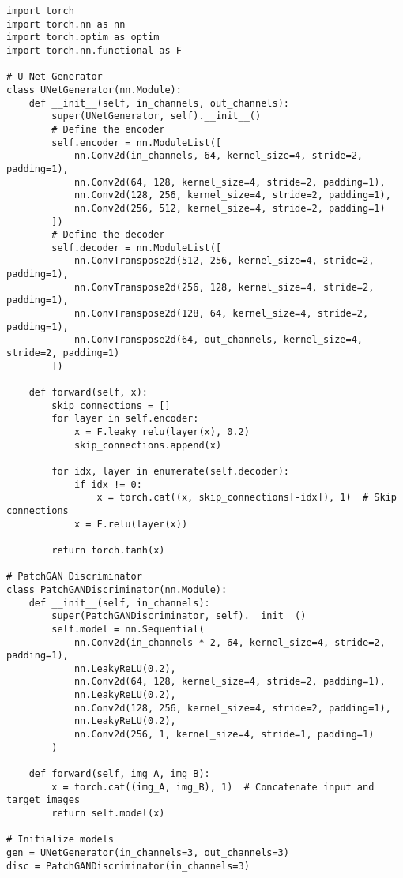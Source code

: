 \begin{lstlisting}[style=python]
import torch
import torch.nn as nn
import torch.optim as optim
import torch.nn.functional as F

# U-Net Generator
class UNetGenerator(nn.Module):
    def __init__(self, in_channels, out_channels):
        super(UNetGenerator, self).__init__()
        # Define the encoder
        self.encoder = nn.ModuleList([
            nn.Conv2d(in_channels, 64, kernel_size=4, stride=2, padding=1), 
            nn.Conv2d(64, 128, kernel_size=4, stride=2, padding=1), 
            nn.Conv2d(128, 256, kernel_size=4, stride=2, padding=1), 
            nn.Conv2d(256, 512, kernel_size=4, stride=2, padding=1)
        ])
        # Define the decoder
        self.decoder = nn.ModuleList([
            nn.ConvTranspose2d(512, 256, kernel_size=4, stride=2, padding=1),
            nn.ConvTranspose2d(256, 128, kernel_size=4, stride=2, padding=1),
            nn.ConvTranspose2d(128, 64, kernel_size=4, stride=2, padding=1),
            nn.ConvTranspose2d(64, out_channels, kernel_size=4, stride=2, padding=1)
        ])
    
    def forward(self, x):
        skip_connections = []
        for layer in self.encoder:
            x = F.leaky_relu(layer(x), 0.2)
            skip_connections.append(x)
        
        for idx, layer in enumerate(self.decoder):
            if idx != 0:
                x = torch.cat((x, skip_connections[-idx]), 1)  # Skip connections
            x = F.relu(layer(x))
        
        return torch.tanh(x)

# PatchGAN Discriminator
class PatchGANDiscriminator(nn.Module):
    def __init__(self, in_channels):
        super(PatchGANDiscriminator, self).__init__()
        self.model = nn.Sequential(
            nn.Conv2d(in_channels * 2, 64, kernel_size=4, stride=2, padding=1),
            nn.LeakyReLU(0.2),
            nn.Conv2d(64, 128, kernel_size=4, stride=2, padding=1),
            nn.LeakyReLU(0.2),
            nn.Conv2d(128, 256, kernel_size=4, stride=2, padding=1),
            nn.LeakyReLU(0.2),
            nn.Conv2d(256, 1, kernel_size=4, stride=1, padding=1)
        )
    
    def forward(self, img_A, img_B):
        x = torch.cat((img_A, img_B), 1)  # Concatenate input and target images
        return self.model(x)

# Initialize models
gen = UNetGenerator(in_channels=3, out_channels=3)
disc = PatchGANDiscriminator(in_channels=3)


\end{lstlisting}
